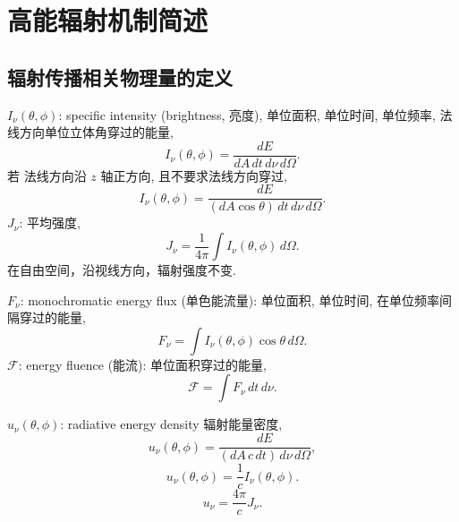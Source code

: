 \chapter{高能辐射机制简述}

\section{辐射传播相关物理量的定义}

$I_\nu(\theta,\phi)$: specific intensity (brightness, 亮度), 单位面积, 单位时间, 单位频率, 法线方向单位立体角穿过的能量,
\begin{equation}
    I_\nu(\theta,\phi)=\frac{d E}{d A\, d t\, d\nu \,d\Omega} .
\end{equation}
若 法线方向沿 $z$ 轴正方向, 且不要求法线方向穿过,
\begin{equation}
    I_\nu(\theta,\phi)=\frac{d E}{(d A\cos\theta) \,d t \,d\nu \,d\Omega} .
\end{equation}
$J_\nu$: 平均强度,
\begin{equation}
    J_\nu=\frac{1 }{4\pi}\int I_\nu(\theta,\phi)\,d\Omega .
\end{equation}
在自由空间，沿视线方向，辐射强度不变.

$F_\nu$:  monochromatic energy flux (单色能流量): 单位面积, 单位时间, 在单位频率间隔穿过的能量,
\begin{equation}
    F_\nu=\int I_\nu(\theta,\phi)\cos\theta \,d\Omega . 
\end{equation}
$\mathcal{F}$: energy fluence (能流): 单位面积穿过的能量, 
\begin{equation}
    \mathcal{F}=\int F_\nu\,dt \,d\nu .
\end{equation}

$u_\nu(\theta,\phi)$: radiative energy density 辐射能量密度,
\begin{equation}
    u_\nu(\theta,\phi)=\frac{d E}{(d A \,c\,d t )\, d\nu \,d\Omega},
\end{equation}
\begin{equation}
    u_\nu(\theta,\phi)=\frac{1}{c}I_\nu(\theta,\phi).
\end{equation}
\begin{equation}
    u_\nu=\frac{4\pi}{c}J_\nu.
\end{equation}

